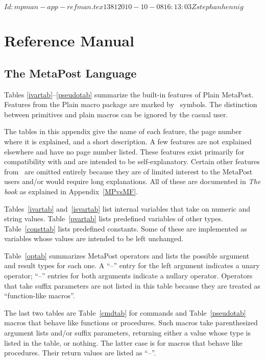 \svnInfo $Id: mpman-app-refman.tex 1381 2010-10-08 16:13:03Z stephanhennig $
\section{Reference Manual}
\label{refman}

\begingroup
\renewcommand\topfraction{1.0}%
\renewcommand\textfraction{0.0}
\setcounter{topnumber}{10}
\setcounter{totalnumber}{10}

\subsection{The MetaPost Language}
\label{refman:lang}

Tables \ref{ivartab}--\ref{pseudotab} summarize the built-in features of
Plain MetaPost.  Features from the Plain macro
package are marked by \pl\ symbols.  The distinction between primitives
and plain macros can be ignored by the casual user.

The tables in this appendix give the name of each feature, the page
number where it is explained, and a short description.  A few features
are not explained elsewhere and have no page number listed.  These
features exist primarily for compatibility with \MF{}
and are intended to be self-explanatory.  Certain other features from
\MF\ are omitted entirely because they are of limited interest to the
MetaPost users and/or would require long explanations.  All of these are
documented in {\sl The \MF book} \cite{kn:c} as explained in
Appendix~\ref{MPvsMF}.

Tables~\ref{ivartab} and~\ref{isvartab} list internal variables that
take on numeric and string values.  Table~\ref{pvartab} lists predefined
variables of other types.  Table~\ref{consttab} lists predefined
constants.  Some of these are implemented as variables whose values are
intended to be left unchanged.

Table~\ref{optab} summarizes MetaPost operators and lists
the possible argument and result types for each one.  A ``--'' entry for
the left argument indicates a unary operator; ``--'' entries for both
arguments indicate a nullary operator.  Operators that take suffix
parameters are not listed in this table because they are treated as
``function-like macros''.

The last two tables are Table~\ref{cmdtab} for commands and
Table~\ref{pseudotab} macros that behave like functions or procedures.
Such macros take parenthesized argument lists and/or suffix parameters,
returning either a value whose type is listed in the table, or nothing.
The latter case is for macros that behave like procedures.  Their return
values are listed as ``--''.

